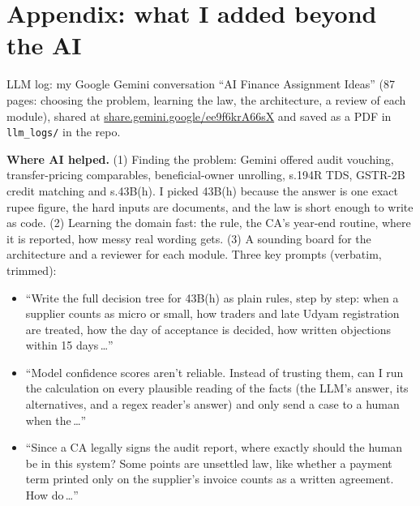 \documentclass[10pt,a4paper]{article}
\begin{document}
\clearpage
\section*{Appendix: what I added beyond the AI}

{\footnotesize\color{muted} LLM log: my Google Gemini conversation ``AI Finance Assignment Ideas'' (87 pages: choosing the problem, learning the law, the architecture, a review of each module), shared at \href{https://share.gemini.google/ee9f6krA66sX}{share.gemini.google/ee9f6krA66sX} and saved as a PDF in \texttt{llm\_logs/} in the repo.\par}

\textbf{Where AI helped.} (1) Finding the problem: Gemini offered audit vouching, transfer-pricing comparables, beneficial-owner unrolling, s.194R TDS, GSTR-2B credit matching and s.43B(h). I picked 43B(h) because the answer is one exact rupee figure, the hard inputs are documents, and the law is short enough to write as code. (2) Learning the domain fast: the rule, the CA's year-end routine, where it is reported, how messy real wording gets. (3) A sounding board for the architecture and a reviewer for each module. Three key prompts (verbatim, trimmed):
\begin{itemize}
\item ``Write the full decision tree for 43B(h) as plain rules, step by step: when a supplier counts as micro or small, how traders and late Udyam registration are treated, how the day of acceptance is decided, how written objections within 15 days\,\ldots''
\item ``Model confidence scores aren't reliable. Instead of trusting them, can I run the calculation on every plausible reading of the facts (the LLM's answer, its alternatives, and a regex reader's answer) and only send a case to a human when the\,\ldots''
\item ``Since a CA legally signs the audit report, where exactly should the human be in this system? Some points are unsettled law, like whether a payment term printed only on the supplier's invoice counts as a written agreement. How do\,\ldots''
\end{itemize}
\end{document}
